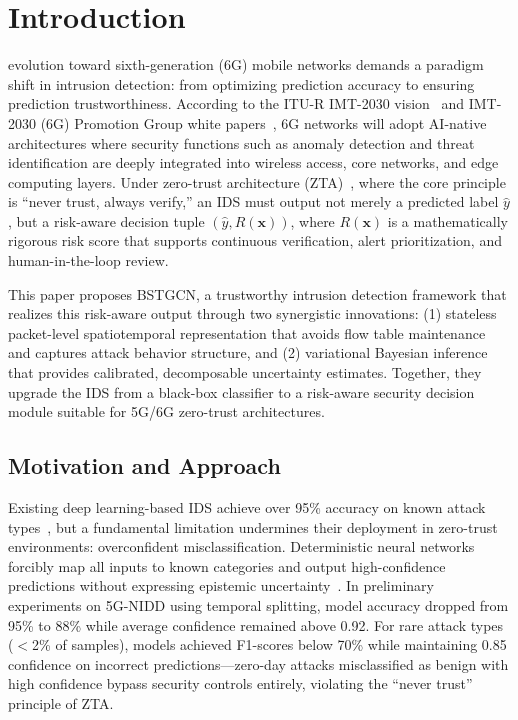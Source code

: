 \documentclass[lettersize,journal]{IEEEtran}
\begin{document}
\section{Introduction}
 evolution toward sixth-generation (6G) mobile networks demands a paradigm shift in intrusion detection: from optimizing prediction accuracy to ensuring prediction trustworthiness. According to the ITU-R IMT-2030 vision~\cite{ITU_IMT2030_2023} and IMT-2030 (6G) Promotion Group white papers~\cite{IMT2030_6G_WhitePaper_2021}, 6G networks will adopt AI-native architectures where security functions such as anomaly detection and threat identification are deeply integrated into wireless access, core networks, and edge computing layers. Under zero-trust architecture (ZTA)~\cite{NIST-ZTA}, where the core principle is ``never trust, always verify,'' an IDS must output not merely a predicted label $\hat{y}$, but a risk-aware decision tuple $(\hat{y}, R(\mathbf{x}))$, where $R(\mathbf{x})$ is a mathematically rigorous risk score that supports continuous verification, alert prioritization, and human-in-the-loop review.

This paper proposes BSTGCN, a trustworthy intrusion detection framework that realizes this risk-aware output through two synergistic innovations: (1) stateless packet-level spatiotemporal representation that avoids flow table maintenance and captures attack behavior structure, and (2) variational Bayesian inference that provides calibrated, decomposable uncertainty estimates. Together, they upgrade the IDS from a black-box classifier to a risk-aware security decision module suitable for 5G/6G zero-trust architectures.

\subsection{Motivation and Approach}

Existing deep learning-based IDS achieve over 95\% accuracy on known attack types~\cite{Habeeb_NIDS_AI_Survey_2022,Rabiu_AIDriven_NIDS_Review_2025}, but a fundamental limitation undermines their deployment in zero-trust environments: overconfident misclassification. Deterministic neural networks forcibly map all inputs to known categories and output high-confidence predictions without expressing epistemic uncertainty~\cite{Guo_Calibration_2017,Gal_Uncertainty_2016}. In preliminary experiments on 5G-NIDD using temporal splitting, model accuracy dropped from 95\% to 88\% while average confidence remained above 0.92. For rare attack types ($<$2\% of samples), models achieved F1-scores below 70\% while maintaining 0.85 confidence on incorrect predictions---zero-day attacks misclassified as benign with high confidence bypass security controls entirely, violating the ``never trust'' principle of ZTA.
\end{document}
